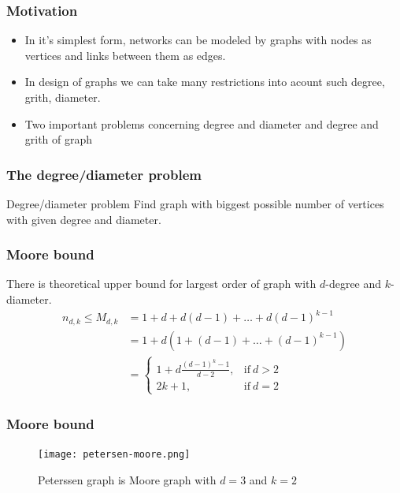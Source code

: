 \documentclass{beamer}
\begin{document}
\begin{frame}
	\frametitle{Motivation}
\begin{itemize}
    \item In it's simplest form, networks can be modeled by graphs with nodes as vertices and links between them as edges.
	\item In design of graphs we can take many restrictions into acount such degree, grith, diameter.
	\item Two important problems concerning degree and diameter and degree and grith of graph
\end{itemize}
\end{frame}
\begin{frame}
\frametitle{The degree/diameter problem}
	\begin{block}{Degree/diameter problem}
		Find graph with biggest possible number of vertices with given degree and diameter.
	\end{block}
\end{frame}
\begin{frame}
	\frametitle{Moore bound}
There is theoretical upper bound for largest order of graph with $d$-degree and $k$-diameter.
\begin{equation}\label{eq:Moore}
	\begin{split}
		n_{d,k} \leq M_{d,k}    & = 1 + d + d(d - 1) + \dots + d(d - 1)^{k-1}  \\
								& = 1 + d(1 + (d - 1) + \dots + (d - 1)^{k-1}) \\
                                & = \begin{cases}
                                        1+d\frac{(d-1)^{k}-1}{d-2}, & \text{if}\ d > 2 \\
                                    	2k+1, & \text{if}\ d=2
    								\end{cases}
    \end{split}
\end{equation}
\end{frame}
\begin{frame}
	\frametitle{Moore bound}
		\begin{figure}[!ht]
    		\centering
    		\texttt{[image: petersen-moore.png]}
    		\caption{Peterssen graph is Moore graph with $d=3$ and $k=2$ }
		\end{figure}
\end{frame}
\end{document}

